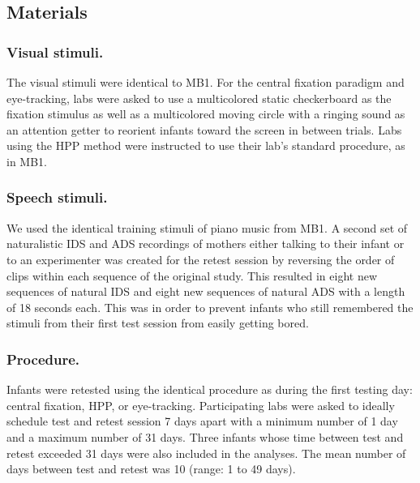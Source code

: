 \documentclass[
  man,floatsintext]{apa6}
\begin{document}
\hypertarget{materials}{%
\subsection{Materials}\label{materials}}

\hypertarget{visual-stimuli.}{%
\subsubsection{Visual stimuli.}\label{visual-stimuli.}}

The visual stimuli were identical to MB1. For the central fixation paradigm and eye-tracking, labs were asked to use a multicolored static checkerboard as the fixation stimulus as well as a multicolored moving circle with a ringing sound as an attention getter to reorient infants toward the screen in between trials. Labs using the HPP method were instructed to use their lab's standard procedure, as in MB1.

\hypertarget{speech-stimuli.}{%
\subsubsection{Speech stimuli.}\label{speech-stimuli.}}

We used the identical training stimuli of piano music from MB1. A second set of naturalistic IDS and ADS recordings of mothers either talking to their infant or to an experimenter was created for the retest session by reversing the order of clips within each sequence of the original study. This resulted in eight new sequences of natural IDS and eight new sequences of natural ADS with a length of 18 seconds each. This was in order to prevent infants who still remembered the stimuli from their first test session from easily getting bored.

\hypertarget{procedure.}{%
\subsubsection{Procedure.}\label{procedure.}}

Infants were retested using the identical procedure as during the first testing day: central fixation, HPP, or eye-tracking. Participating labs were asked to ideally schedule test and retest session 7 days apart with a minimum number of 1 day and a maximum number of 31 days. Three infants whose time between test and retest exceeded 31 days were also included in the analyses. The mean number of days between test and retest was 10 (range: 1 to 49 days).
\end{document}

